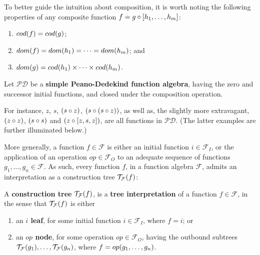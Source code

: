 To better guide the intuition about composition, it is worth noting the
following properties of any composite function $f = g \circ \mathopen{}\left[{h_1, \ldots,
h_m}\right]\mathclose{}$:

\begin{enumerate}

\item $cod{\mathopen{}\left({f}\right)\mathclose{}} = cod{\mathopen{}\left({g}\right)\mathclose{}}$;

\item $dom{\mathopen{}\left({f}\right)\mathclose{}} = dom{\mathopen{}\left({h_1}\right)\mathclose{}} = \cdots = dom{\mathopen{}\left({h_m}\right)\mathclose{}}$; and

\item $dom{\mathopen{}\left({g}\right)\mathclose{}} = cod{\mathopen{}\left({h_1}\right)\mathclose{}} \times \cdots \times cod{\mathopen{}\left({h_m}\right)\mathclose{}}$.

\end{enumerate}

\begin{definition} \label{def:function-algebra-p} Let $\mathcal{PD}$ be a
\textbf{simple Peano-Dedekind function algebra}, having the zero and successor
initial functions, and closed under the composition operation.\end{definition}

For instance, $z$, $s$, ${\mathopen{}\left({s \circ z}\right)\mathclose{}}$, ${\mathopen{}\left({s \circ {\ensuremath{\mathopen{}\left({s \circ z}\right)\mathclose{}}}}\right)\mathclose{}}$, as well
as, the slightly more extravagant, ${\mathopen{}\left({z \circ z}\right)\mathclose{}}$, ${\mathopen{}\left({s \circ s}\right)\mathclose{}}$ and ${\mathopen{}\left({z
\circ \mathopen{}\left[{z, s, z}\right]\mathclose{}}\right)\mathclose{}}$, are all functions in $\mathcal{PD}$. (The latter
examples are further illuminated below.)

More generally, a function $f \in \mathcal{F}$ is either an initial function $i
\in \mathcal{F}_I$, or the application of an operation $op \in \mathcal{F}_O$
to an adequate sequence of functions $g_1, \ldots, g_n \in \mathcal{F}$.  As
such, every function $f$, in a function algebra $\mathcal{F}$, admits an
interpretation as a construction tree $\mathcal{T}_\mathcal{F}{\mathopen{}\left({f}\right)\mathclose{}}$:

\begin{definition} \label{def:construction-tree} A \textbf{construction tree}
$\mathcal{T}_\mathcal{F}{\mathopen{}\left({f}\right)\mathclose{}}$, is a \textbf{tree interpretation} of a function
$f \in \mathcal{F}$, in the sense that $\mathcal{T}_\mathcal{F}{\mathopen{}\left({f}\right)\mathclose{}}$ is either

\begin{enumerate}[label=(\arabic*)]

\item an \textbf{$i$ leaf}, for some initial function $i \in \mathcal{F}_I$, where $f =
i$; or

\item an \textbf{$op$ node}, for some operation $op \in \mathcal{F}_O$, having
the outbound subtrees $\mathcal{T}_\mathcal{F}{\mathopen{}\left({g_1}\right)\mathclose{}}, \ldots,
\mathcal{T}_\mathcal{F}{\mathopen{}\left({g_n}\right)\mathclose{}}$, where $f = op{\mathopen{}\left({g_1, \ldots, g_n}\right)\mathclose{}}$.

\end{enumerate}

\end{definition}

